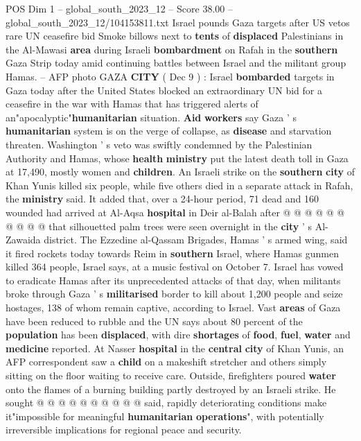 \begin{textsample}{POS Dim 1 – global\_south\_2023\_12 – Score 38.00 – global\_south\_2023\_12/104153811.txt}  \label{ex:f1_pos_034}
Israel pounds Gaza targets after US vetos rare UN ceasefire bid Smoke billows next to \textbf{tents} of \textbf{displaced} Palestinians in the Al-Mawasi \textbf{area} during Israeli \textbf{bombardment} on Rafah in the \textbf{southern} Gaza Strip today amid continuing battles between Israel and the militant group Hamas. -- AFP photo GAZA \textbf{CITY} ( Dec 9 ) : Israel \textbf{bombarded} targets in Gaza today after the United States blocked an extraordinary UN bid for a ceasefire in the war with Hamas that has triggered alerts of an"apocalyptic"\textbf{humanitarian} situation. \textbf{Aid} \textbf{workers} say Gaza ' s \textbf{humanitarian} system is on the verge of collapse, as \textbf{disease} and starvation threaten.
Washington ' s veto was swiftly condemned by the Palestinian Authority and Hamas, whose \textbf{health} \textbf{ministry} put the latest death toll in Gaza at 17,490, mostly women and \textbf{children}.
An Israeli strike on the \textbf{southern} \textbf{city} of Khan Yunis killed six people, while five others died in a separate attack in Rafah, the \textbf{ministry} said.
It added that, over a 24-hour period, 71 dead and 160 wounded had arrived at Al-Aqsa \textbf{hospital} in Deir al-Balah after @ @ @ @ @ @ @ @ @ @ that silhouetted palm trees were seen overnight in the \textbf{city} ' s Al-Zawaida district.
The Ezzedine al-Qassam Brigades, Hamas ' s armed wing, said it fired rockets today towards Reim in \textbf{southern} Israel, where Hamas gunmen killed 364 people, Israel says, at a music festival on October 7.
Israel has vowed to eradicate Hamas after its unprecedented attacks of that day, when militants broke through Gaza ' s \textbf{militarised} border to kill about 1,200 people and seize hostages, 138 of whom remain captive, according to Israel.
Vast \textbf{areas} of Gaza have been reduced to rubble and the UN says about 80 percent of the \textbf{population} has been \textbf{displaced}, with dire \textbf{shortages} of \textbf{food}, \textbf{fuel}, \textbf{water} and \textbf{medicine} reported.
At Nasser \textbf{hospital} in the \textbf{central} \textbf{city} of Khan Yunis, an AFP correspondent saw a \textbf{child} on a makeshift stretcher and others simply sitting on the floor waiting to receive care.
Outside, firefighters poured \textbf{water} onto the flames of a burning building partly destroyed by an Israeli strike.
He sought @ @ @ @ @ @ @ @ @ @ said, rapidly deteriorating conditions make it"impossible for meaningful \textbf{humanitarian} \textbf{operations}", with potentially irreversible implications for regional peace and security.

\end{textsample}
